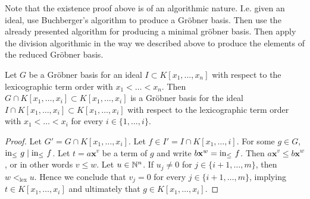 \begin{remark}
    Note that the existence proof above is of an algorithmic nature. I.e. given an ideal, use Buchberger's algorithm to produce a Gröbner basis. Then use the already presented algorithm for producing a minimal gröbner basis. Then apply the division algorithmic in the way we described above to produce the elements of the reduced Gröbner basis. 
\end{remark}
\begin{theorem}\label{GBElimTheorem}
    Let $G$ be a Gröbner basis for an ideal $I\subset K[x_1,\dots,x_n]$ with respect to the lexicographic term order with $x_1<\dots<x_n$. Then $G\cap K[x_1,\dots,x_i]\subset K[x_1,\dots,x_i]$ is a Gröbner basis for the ideal $I\cap K[x_1,\dots,x_i]\subset K[x_1,\dots,x_i]$ with respect to the lexicographic term order with $x_1<\dots< x_i$ for every $i\in\{1,\dots,i\}$.
\end{theorem}
\begin{proof}
    Let $G'=G\cap K[x_1,\dots,x_i]$. Let $f\in I' = I\cap K[x_1,\dots,i]$.  For some $g\in G$, $\mathrm{in}_\leq\ g \mid \mathrm{in}_\leq \ f$. Let $t=a\mathbf{x}^v$ be a term of $g$ and write $b\mathbf{x}^w = \mathrm{in}_\leq\ f$. Then 
    $a\mathbf{x}^v\leq b\mathbf{x}^w$, or in other words $v \leq w$. Let $u\in \mathbb{N}^n$. If $u_j \neq 0$ for $j\in\{i+1,\dots,m\}$, then $w<_\text{lex} u$. Hence we conclude that $v_j = 0$ for every $j\in\{i+1,\dots,m\}$, implying $t\in K[x_1,\dots,x_i]$ and ultimately that $g\in K[x_1,\dots,x_i]$.
\end{proof}
 
